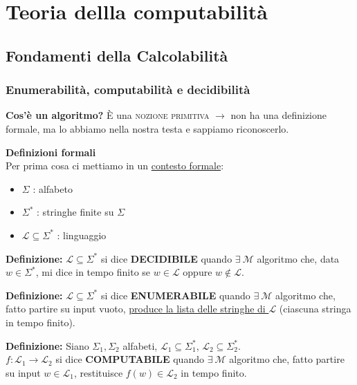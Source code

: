 \section{Teoria dellla computabilità}

\subsection{Fondamenti della Calcolabilità}
\subsubsection{Enumerabilità, computabilità e decidibilità}

\textbf{Cos'è un algoritmo?}
È una \textsc{nozione primitiva} $\longrightarrow$ non ha una definizione formale, ma lo abbiamo nella nostra testa e sappiamo riconoscerlo.

\vspace{0.4cm}
\textbf{Definizioni formali} \\
Per prima cosa ci mettiamo in un \underline{contesto formale}:
\begin{itemize}
    \item $\Sigma$ : alfabeto
    \item $\Sigma^*$ : stringhe finite su $\Sigma$
    \item $\mathcal{L} \subseteq \Sigma^*$ : linguaggio
\end{itemize}

\vspace{0.4cm}
\textbf{Definizione:} $\mathcal{L} \subseteq \Sigma^*$ si dice \textbf{DECIDIBILE} quando $\exists\ \mathcal{M}$ algoritmo che, data $w \in \Sigma^*$, mi dice in tempo finito se $w \in \mathcal{L}$ oppure $w \notin \mathcal{L}$.

\vspace{0.4cm}
\textbf{Definizione:} $\mathcal{L} \subseteq \Sigma^*$ si dice \textbf{ENUMERABILE} quando $\exists\ \mathcal{M}$ algoritmo che, fatto partire su input vuoto, \underline{produce la lista delle stringhe di $\mathcal{L}$} (ciascuna stringa in tempo finito).

\vspace{0.4cm}
\textbf{Definizione:} Siano $\Sigma_1, \Sigma_2$ alfabeti, $\mathcal{L}_1 \subseteq \Sigma_1^*$, $\mathcal{L}_2 \subseteq \Sigma_2^*$. \\
$f: \mathcal{L}_1 \to \mathcal{L}_2$ si dice \textbf{COMPUTABILE} quando $\exists\ \mathcal{M}$ algoritmo che, fatto partire su input $w \in \mathcal{L}_1$, restituisce $f(w) \in \mathcal{L}_2$ in tempo finito.

